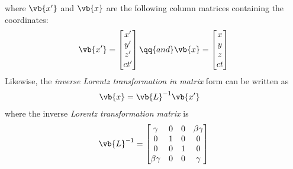 		where $\vb{x'}$ and $\vb{x}$ are the following column matrices containing the coordinates:
		\begin{align*}
			\vb{x'}=\begin{bmatrix}
				{x'} \\
				{y'} \\
				{z'} \\
				{ct'}
			\end{bmatrix}\qq{and}\vb{x}=\begin{bmatrix}
					{x} \\
					{y} \\
					{z} \\
					{ct}
				\end{bmatrix}
		\end{align*}
		Likewise, the \emph{inverse Lorentz transformation in matrix} form can be written as
		\begin{align*}
			\vb{x}&=\vb{L}^{-1}\vb{x'}
		\end{align*}
		where the inverse \emph{Lorentz transformation matrix} is
		\begin{align*}
			\vb{L}^{-1}=\begin{bmatrix}
				{\gamma} & {0} & {0} & {\beta\gamma} \\
				{0} & {1} & {0} & {0} \\
				{0} & {0} & {1} & {0} \\
				{\beta\gamma} & {0} & {0} & {\gamma}
			\end{bmatrix}
		\end{align*}